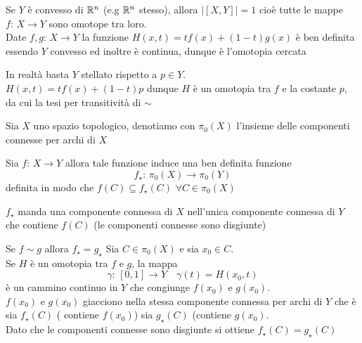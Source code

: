  \begin{ese}Se $Y$ \`e convesso di $\mathbb{R}^n$ (e.g $\mathbb{R}^n$ stesso), allora $\vert [ X , Y] \vert =1$ cio\`e tutte le mappe $f:\, X \to Y$ sono omotope tra loro.\\
 Date $f,g:\, X \to Y$ la funzione $H(x,t)= t f(x) + (1-t) g(x)$ \`e ben definita essendo $Y$ convesso ed inoltre \`e continua, dunque \`e l'omotopia cercata
 \begin{oss} In realt\`a basta $Y$ stellato rispetto a $p\in Y$.\\
 $H(x,t)=tf(x)+ (1-t)p$ dunque $H$ \`e un omotopia tra $f$ e la costante $p$, da cui la tesi per transitivit\`a di $\sim $ 
 \end{oss}
 \end{ese}
 \spazio
 \begin{defn}Sia $X$ uno spazio topologico, denotiamo con $\pi_0(X)$ l'insieme delle componenti connesse per archi di $X$
 \end{defn}
 \begin{defn}Sia $f:\, X \to Y$ allora tale funzione induce una ben definita funzione
 $$ f_\star : \, \pi_0(X) \to \pi_0(Y)$$ 
 definita in modo che $f(C) \subseteq f_\star(C)$ $\forall C \in \pi_0(X)$ 
 \begin{oss}$f_\star$ manda una componente connessa di $X$ nell'unica componente connessa di $Y$ che contiene $f(C)$ (le componenti connesse sono disgiunte)
 \end{oss}
 \end{defn}
 \begin{lem}Se $f\sim g$ allora $f_\star=g_\star$
 \proof Sia $C \in \pi_0(X)$ e sia $x_0 \in C$.\\
 Se $H$ \`e un omotopia tra $f$ e $g$, la mappa $$\gamma:\, [0,1]\to Y \quad \gamma(t) = H(x_0,t)$$
 \`e un cammino continuo in $Y$ che congiunge $f(x_0)$ e $g(x_0)$.\\
 $f(x_0)$ e $g(x_0)$ giacciono nella stessa componente connessa per archi di $Y$ che \`e sia $f_\star(C)$ ( contiene $f(x_0)$) sia $g_\star(C)$ (contiene $g(x_0)$.\\
 Dato che le componenti connesse sono disgiunte si ottiene $f_\star(C)=g_\star(C)$
 \endproof
 \end{lem}

